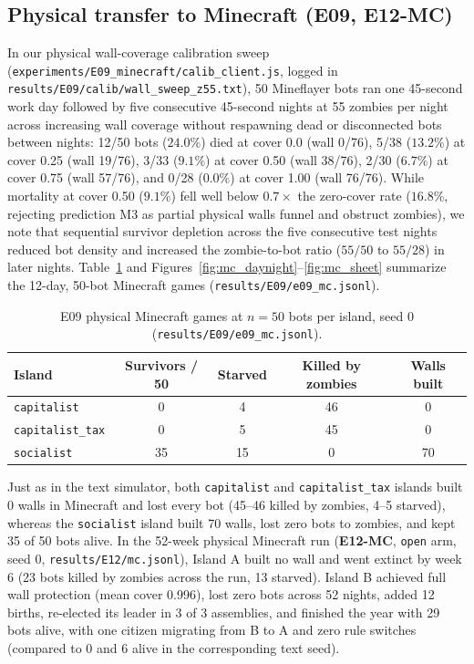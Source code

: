 \documentclass[10pt,letterpaper]{article}
\begin{document}
\subsection{Physical transfer to Minecraft (E09, E12-MC)}\label{sec:mc}

In our physical wall-coverage calibration sweep (\texttt{experiments/E09\_minecraft/calib\_client.js}, logged in \texttt{results/E09/calib/wall\_sweep\_z55.txt}), 50 Mineflayer bots ran one 45-second work day followed by five consecutive 45-second nights at 55 zombies per night across increasing wall coverage without respawning dead or disconnected bots between nights: 12/50 bots ($24.0\%$) died at cover 0.0 (wall 0/76), 5/38 ($13.2\%$) at cover 0.25 (wall 19/76), 3/33 ($9.1\%$) at cover 0.50 (wall 38/76), 2/30 ($6.7\%$) at cover 0.75 (wall 57/76), and 0/28 ($0.0\%$) at cover 1.00 (wall 76/76). While mortality at cover 0.50 ($9.1\%$) fell well below $0.7\times$ the zero-cover rate ($16.8\%$, rejecting prediction M3 as partial physical walls funnel and obstruct zombies), we note that sequential survivor depletion across the five consecutive test nights reduced bot density and increased the zombie-to-bot ratio ($55/50$ to $55/28$) in later nights. Table~\ref{tab:e09} and Figures~\ref{fig:mc_daynight}--\ref{fig:mc_sheet} summarize the 12-day, 50-bot Minecraft games (\texttt{results/E09/e09\_mc.jsonl}).

\begin{table}[!htb]
\centering
\caption{E09 physical Minecraft games at $n = 50$ bots per island, seed 0 (\texttt{results/E09/e09\_mc.jsonl}).}
\label{tab:e09}
\footnotesize
\setlength{\tabcolsep}{10pt}
\begin{tabular}{@{}lcccc@{}}
\toprule
\textbf{Island} & \textbf{Survivors / 50} & \textbf{Starved} & \textbf{Killed by zombies} & \textbf{Walls built} \\
\midrule
\texttt{capitalist} & 0 & 4 & 46 & 0 \\
\texttt{capitalist\_tax} & 0 & 5 & 45 & 0 \\
\texttt{socialist} & 35 & 15 & 0 & 70 \\
\bottomrule
\end{tabular}
\end{table}

Just as in the text simulator, both \texttt{capitalist} and \texttt{capitalist\_tax} islands built 0 walls in Minecraft and lost every bot (45--46 killed by zombies, 4--5 starved), whereas the \texttt{socialist} island built 70 walls, lost zero bots to zombies, and kept 35 of 50 bots alive. In the 52-week physical Minecraft run (\textbf{E12-MC}, \texttt{open} arm, seed 0, \texttt{results/E12/mc.jsonl}), Island A built no wall and went extinct by week 6 (23 bots killed by zombies across the run, 13 starved). Island B achieved full wall protection (mean cover 0.996), lost zero bots across 52 nights, added 12 births, re-elected its leader in 3 of 3 assemblies, and finished the year with 29 bots alive, with one citizen migrating from B to A and zero rule switches (compared to 0 and 6 alive in the corresponding text seed).
\end{document}
